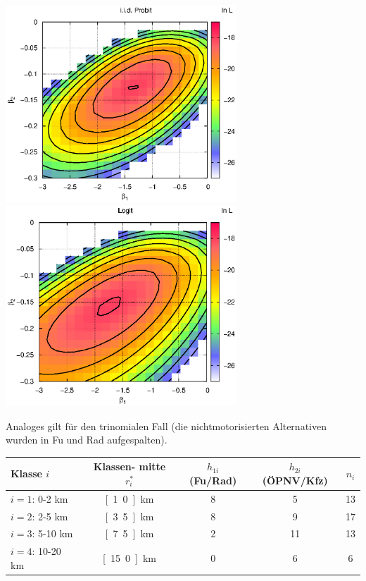\documentclass[a4paper]{foils}
\begin{document}
\begin{landscape}
\begin{center}
 \includegraphics[width=0.65\textwidth]{./figsDiscr/kalProbitTrinom_beta1beta2.eps}
 \includegraphics[width=0.65\textwidth]{./figsDiscr/kalLogitTrinom_beta1beta2.eps}   
\vspace{1em}

\parbox{1.1\textwidth}{Analoges gilt f\"ur den trinomialen Fall (die
  nichtmotorisierten Alternativen wurden in Fu\3 und Rad aufgespalten).
}

\newpage
\vspace{3em}
\begin{center}
\begin{tabular}{|l||c|c|c||c|} \hline
Klasse $i$ & 
\myBox{4em}{Klassen-\\mitte $r^*_i$} &
\myBox{4em}{ $h_{1i}$\\(Fu\3/Rad)} &
\myBox{5em}{ $h_{2i}$\\ (\"OPNV/Kfz)}  & $n_i$ \\
\hline\hline
$i=1$: 0-2 km  & \unit[1.0]{km} & 8 & 5 & 13 \\
$i=2$: 2-5 km  & \unit[3.5]{km} & 8 & 9 & 17\\
$i=3$: 5-10 km  & \unit[7.5]{km} & 2 & 11 & 13\\
$i=4$: 10-20 km  & \unit[15.0]{km} & 0 & 6 & 6 \\ \hline
\end{tabular}
\end{center}




\end{center}
\end{landscape}
\end{document}
